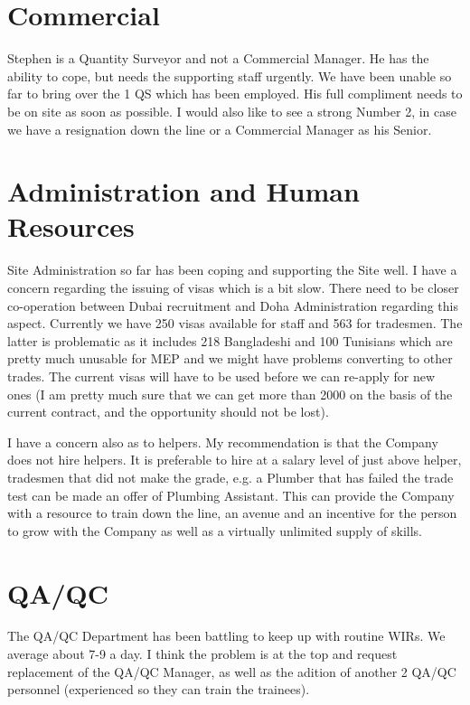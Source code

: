 \section*{Commercial}

Stephen is a Quantity Surveyor and not a Commercial Manager. He has the ability to cope, but needs the supporting staff urgently. We have been unable so far to bring over the 1 QS which has been employed. His full compliment needs to be on site as soon as possible. I would also like to see a strong Number 2, in case we have a resignation down the line or a Commercial Manager as his Senior. 

\section*{Administration and Human Resources}

Site Administration so far has been coping and supporting the Site well. I have a concern regarding the issuing of visas which is a bit slow. There need to be closer co-operation between Dubai recruitment and Doha Administration regarding this aspect. Currently we have 250 visas available for staff and 563 for tradesmen. The latter is problematic as it includes 218 Bangladeshi and 100 Tunisians which are pretty much unusable for MEP and we might have problems converting to other trades. The current visas will have to be used before we can re-apply for new ones (I am pretty much sure that we can get more than 2000 on the basis of the current contract, and the opportunity should not be lost). 

I have a concern also as to helpers. My recommendation is that the Company does not hire helpers. It is preferable to hire at a salary level of just above helper, tradesmen that did not make the grade, e.g. a Plumber that has failed the trade test can be made an offer of Plumbing Assistant. This can provide the Company with a resource to train down the line, an avenue and an incentive for the person to grow with the Company as well as a virtually unlimited supply of skills. 

\section*{QA/QC}

The QA/QC Department has been battling to keep up with routine WIRs. We average about 7-9 a day. I think the problem is at the top and request replacement of the QA/QC Manager, as well as the adition of another 2 QA/QC personnel (experienced so they can train the trainees). 

